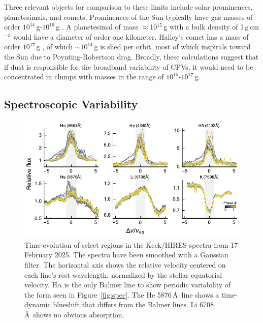 \documentclass{nature3}
\begin{document}
\begin{methods}
Three relevant objects for comparison to these limits include solar
prominences, planetesimals, and comets.
Prominences of the Sun typically have gas masses
of order $10^{14}$\,g-$10^{16}$\,g \cite{VialEngvold2015}.
A planetesimal of mass $\approx$10$^{15}$\,g with a bulk density of
1\,g\,cm$^{-3}$ would have a diameter of order one kilometer.
Halley's comet has a mass of order $10^{17}$\,g \cite{Rickman1989}, of
which $\sim$$10^{14}$\,g is shed per orbit, most of which inspirals
toward the Sun due to Poynting-Robertson drag.
Broadly, these calculations suggest that if dust is responsible for
the broadband variability of CPVs, it would need to be concentrated in
clumps with masses in the range of $10^{15}$-$10^{17}$\,g.



\subsection{Spectroscopic Variability}\phantom{+}

\begin{figure}[!t]
  \centering
  \includegraphics[width=\textwidth]{figures/sf5.pdf}
  \caption{Time evolution of select regions in the Keck/HIRES
  spectra from 17 February 2025.
  The spectra have been smoothed with a Gaussian filter.
  The horizontal axis shows the relative velocity centered on each
  line's rest wavelength, normalized by the stellar equatorial
  velocity.  
  H$\alpha$ is the only Balmer line to show periodic variability of
  the form seen in Figure~\ref{fig:spec}.
  The He 5876\,\AA\ line shows a time-dynamic blueshift that 
  differs from the Balmer lines.
  Li 6708\,\AA\ shows no obvious absorption.
  }
  \label{fig:hirescuts}
\end{figure}


\end{methods}
\end{document}
